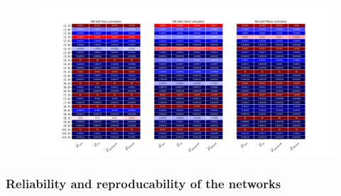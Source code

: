 \documentclass[]{article}
\begin{document}
\newpage
\begin{figure}
	\centering
	\includegraphics[angle=90, height=\textheight]{"Seed 2"}
\end{figure}
\restoregeometry
\clearpage

\newpage
\subsubsection{Reliability and reproducability of the networks}
\end{document}
